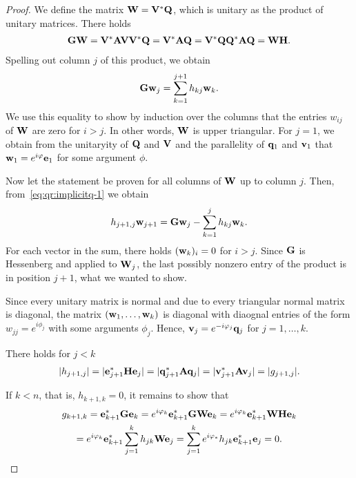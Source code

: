 \begin{proof}
  We define the matrix $\mathbf W = \mathbf V^*\mathbf Q$, which is unitary as the product of unitary matrices. There holds
  \begin{gather}
    \mathbf G\mathbf W = \mathbf V^*\mathbf A\mathbf V\mathbf V^*\mathbf Q = \mathbf V^*\mathbf A\mathbf Q
    = \mathbf V^*\mathbf Q\mathbf Q^*\mathbf A\mathbf Q = \mathbf W\mathbf H.
  \end{gather}
  Spelling out column $j$ of this product, we obtain
  \begin{gather}
    \label{eq:qr:implicitq-1}
    \mathbf G\mathbf w_j = \sum_{k=1}^{j+1} h_{kj} \mathbf w_{k}.
  \end{gather}
  We use this equality to show by induction over the columns that the
  entries $w_{ij}$ of $\mathbf W$ are zero for $i>j$. In other words,
  $\mathbf W$ is upper triangular.  For $j=1$, we obtain from the
  unitaryity of $\mathbf Q$ and $\mathbf V$ and the parallelity of $\mathbf q_1$
  and $\mathbf v_1$ that $\mathbf w_1 = e^{i\varphi} \mathbf e_1$ for some argument $\phi$.

  Now let the statement be proven for all columns of $\mathbf W$ up to
  column $j$. Then, from~\eqref{eq:qr:implicitq-1} we obtain
  \begin{gather}
    h_{j+1,j}\mathbf w_{j+1} = \mathbf G\mathbf w_j - \sum_{k=1}^j h_{kj} \mathbf w_{k}.
  \end{gather}
  For each vector in the sum, there holds $(\mathbf w_{k})_i = 0$ for
  $i>j$. Since $\mathbf G$ is Hessenberg and applied to $\mathbf W_j$, the
  last possibly nonzero entry of the product is in position $j+1$,
  what we wanted to show.

  Since every unitary matrix is normal and due to
   every triangular
  normal matrix is diagonal, the matrix $(\mathbf w_1,\dots,\mathbf w_k)$ is diagonal with
  diaognal entries of the form $w_{jj} = e^{i\phi_j}$ with some
  arguments $\phi_j$. Hence, $\mathbf v_j = e^{-i\varphi_j} \mathbf q_j$ for $j=1,\dots,k$.

  There holds for $j<k$
  \begin{gather}
    \lvert h_{j+1,j}\rvert = \lvert\mathbf e_{j+1}^*\mathbf H\mathbf e_j\rvert = \lvert\mathbf q_{j+1}^*\mathbf A\mathbf q_j\rvert
    = \lvert\mathbf v_{j+1}^*\mathbf A\mathbf v_j\rvert = \lvert g_{j+1,j}\rvert.
  \end{gather}

  If $k<n$, that is, $h_{k+1,k}=0$, it remains to show that
  \begin{multline}
    g_{k+1,k} = \mathbf e_{k+1}^*\mathbf G\mathbf e_k = e^{i\varphi_k}\mathbf e_{k+1}^*\mathbf G\mathbf W\mathbf e_k
    =  e^{i\varphi_k}\mathbf e_{k+1}^*\mathbf W\mathbf H\mathbf e_k\\
    =  e^{i\varphi_k}\mathbf e_{k+1}^* \sum_{j=1}^k h_{jk} \mathbf W\mathbf e_j
    =  \sum_{j=1}^k e^{i\varphi_*} h_{jk} \mathbf e_{k+1}^* \mathbf e_j = 0.
  \end{multline}
\end{proof}

